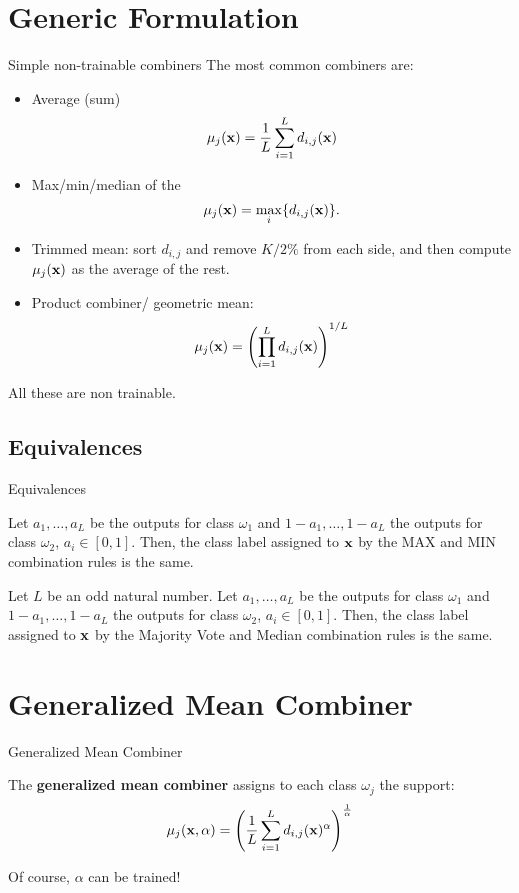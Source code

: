 \documentclass[xcolor=table]{beamer}
\begin{document}
\section{Generic Formulation}
\begin{frame}{Simple non-trainable combiners}
The most common combiners are:
\begin{itemize}
    \item  Average (sum)
    \[
    \mu_j({\mathbf x}) = \frac{1}{L}\sum_{i=1}^L d_{i,j}({\mathbf x})
    \]
    \item Max/min/median of the 
    \[
    \mu_j({\mathbf x}) = \max_i \{d_{i,j}({\mathbf x})\}.
    \]
    \item Trimmed mean: sort \(d_{i,j}\) and remove \(K/2\%\) from each side, and then compute \(\mu_j({\mathbf x})\) as the average of the rest.
    \item Product combiner/ geometric mean:
    \[
    \mu_j({\mathbf x}) = \left(\prod_{i=1}^L d_{i,j}({\mathbf x})\right)^{1/L}
    \]
\end{itemize}
    All these are non trainable.
\end{frame}

\subsection{Equivalences}


\begin{frame}{Equivalences}
\begin{proposition}
    Let \(a_1,\dots,a_L\) be the outputs for class \(\omega_1\) and \(1-a_1,\dots,1-a_L\) the outputs for class \(\omega_2\), \(a_i\in[0,1]\). Then, the class label assigned to \({\mathbf x}\) by the MAX and MIN combination rules is the same.
    \end{proposition}
    \pause
        \begin{proposition}
    Let \(L\) be an odd natural number. Let \(a_1,\dots,a_L\) be the outputs for class \(\omega_1\) and \(1-a_1,\dots,1-a_L\) the outputs for class \(\omega_2\), \(a_i\in[0,1]\). Then, the class label assigned to \({\mathbf x}\) by the Majority Vote and Median combination rules is the same.
    \end{proposition}
\end{frame}


\section{Generalized Mean Combiner}
\begin{frame}{Generalized Mean Combiner}
\begin{definition}
    The \textbf{generalized mean combiner} assigns to each class \(\omega_j\) the support:
    \[
    \mu_j({\mathbf x},\alpha) = \left( \frac{1}{L} \sum_{i=1}^L d_{i,j}({\mathbf x})^\alpha \right)^{\frac{1}{\alpha}}
    \]
\end{definition}

\pause

Of course, \(\alpha\) can be trained! 


\end{frame}
\end{document}
